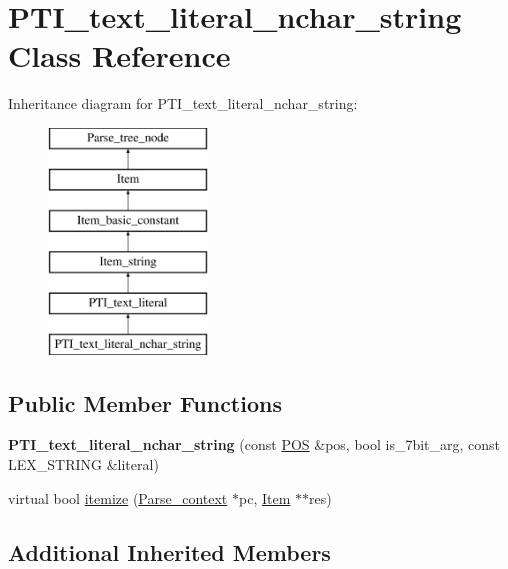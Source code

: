 \hypertarget{classPTI__text__literal__nchar__string}{}\section{P\+T\+I\+\_\+text\+\_\+literal\+\_\+nchar\+\_\+string Class Reference}
\label{classPTI__text__literal__nchar__string}
Inheritance diagram for P\+T\+I\+\_\+text\+\_\+literal\+\_\+nchar\+\_\+string\+:\begin{figure}[H]
\begin{center}
\leavevmode
\includegraphics[height=6.000000cm]{classPTI__text__literal__nchar__string}
\end{center}
\end{figure}
\subsection*{Public Member Functions}
\begin{DoxyCompactItemize}
\item 
\mbox{\label{classPTI__text__literal__nchar__string_af5179d3926d43834db307cd4a2bf09dd}} 
{\bfseries P\+T\+I\+\_\+text\+\_\+literal\+\_\+nchar\+\_\+string} (const \mbox{\hyperlink{structYYLTYPE}{P\+OS}} \&pos, bool is\+\_\+7bit\+\_\+arg, const L\+E\+X\+\_\+\+S\+T\+R\+I\+NG \&literal)
\item 
virtual bool \mbox{\hyperlink{classPTI__text__literal__nchar__string_ae4eda174610721d6a2a61e55d8e6ffec}{itemize}} (\mbox{\hyperlink{structParse__context}{Parse\+\_\+context}} $\ast$pc, \mbox{\hyperlink{classItem}{Item}} $\ast$$\ast$res)
\end{DoxyCompactItemize}
\subsection*{Additional Inherited Members}


